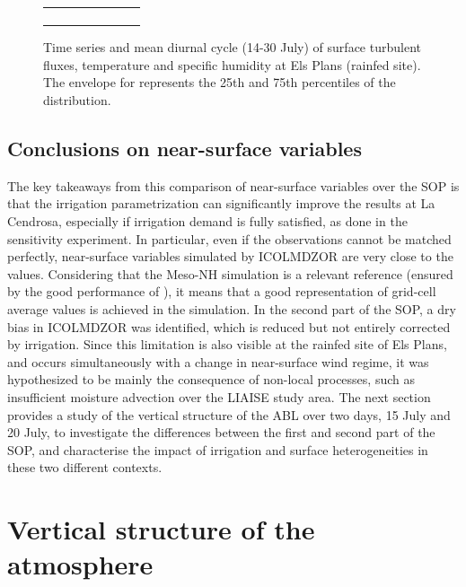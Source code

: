 \begin{figure}[hbtp]
\begin{tabular}{cc}
\begin{subfigure}[t]{0.5\textwidth}
        \end{subfigure}
    \end{tabular}
    \caption{Time series and mean diurnal cycle (14-30 July) of surface turbulent fluxes, temperature and specific humidity at Els Plans (rainfed site). The envelope for \mesomean represents the 25th and 75th percentiles of the distribution.}
    \label{fig:elsplans_surfacevars}
\end{figure}

\subsection*{Conclusions on near-surface variables}
The key takeaways from this comparison of near-surface variables over the SOP is that the irrigation parametrization can significantly improve the results at La Cendrosa, especially if irrigation demand is fully satisfied, as done in the \irrboost sensitivity experiment.
In particular, even if the observations cannot be matched perfectly, near-surface variables simulated by ICOLMDZOR are very close to the \mesomean values. Considering that the Meso-NH simulation is a relevant reference (ensured by the good performance of \mesoexact), it means that a good representation of grid-cell average values is achieved in the \irrboost simulation. 
In the second part of the SOP, a dry bias in ICOLMDZOR was identified, which is reduced but not entirely corrected by irrigation. Since this limitation is also visible at the rainfed site of Els Plans, and occurs simultaneously with a change in near-surface wind regime, it was hypothesized to be mainly the consequence of non-local processes, such as insufficient moisture advection over the LIAISE study area. The next section provides a study of the vertical structure of the ABL over two days, 15 July and 20 July, to investigate the differences between the first and second part of the SOP, and characterise the impact of irrigation and surface heterogeneities in these two different contexts.

\clearpage

\section{Vertical structure of the atmosphere}
\label{sec:iop}

